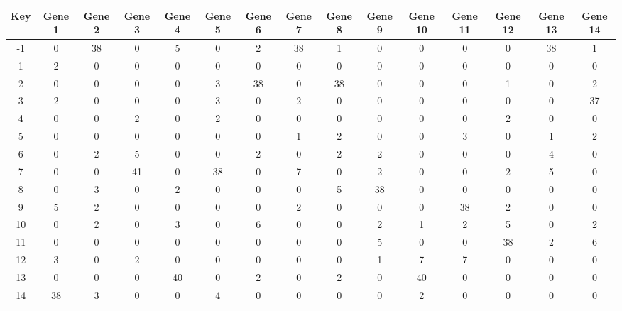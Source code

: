 \begin{tabular}{|c|c|c|c|c|c|c|c|c|c|c|c|c|c|c|}
\hline
Key & Gene 1 & Gene 2 & Gene 3 & Gene 4 & Gene 5 & Gene 6 & Gene 7 & Gene 8 & Gene 9 & Gene 10 & Gene 11 & Gene 12 & Gene 13 & Gene 14 \\
\hline
-1 & 0 & 38 & 0 & 5 & 0 & 2 & 38 & 1 & 0 & 0 & 0 & 0 & 38 & 1 \\
1 & 2 & 0 & 0 & 0 & 0 & 0 & 0 & 0 & 0 & 0 & 0 & 0 & 0 & 0 \\
2 & 0 & 0 & 0 & 0 & 3 & 38 & 0 & 38 & 0 & 0 & 0 & 1 & 0 & 2 \\
3 & 2 & 0 & 0 & 0 & 3 & 0 & 2 & 0 & 0 & 0 & 0 & 0 & 0 & 37 \\
4 & 0 & 0 & 2 & 0 & 2 & 0 & 0 & 0 & 0 & 0 & 0 & 2 & 0 & 0 \\
5 & 0 & 0 & 0 & 0 & 0 & 0 & 1 & 2 & 0 & 0 & 3 & 0 & 1 & 2 \\
6 & 0 & 2 & 5 & 0 & 0 & 2 & 0 & 2 & 2 & 0 & 0 & 0 & 4 & 0 \\
7 & 0 & 0 & 41 & 0 & 38 & 0 & 7 & 0 & 2 & 0 & 0 & 2 & 5 & 0 \\
8 & 0 & 3 & 0 & 2 & 0 & 0 & 0 & 5 & 38 & 0 & 0 & 0 & 0 & 0 \\
9 & 5 & 2 & 0 & 0 & 0 & 0 & 2 & 0 & 0 & 0 & 38 & 2 & 0 & 0 \\
10 & 0 & 2 & 0 & 3 & 0 & 6 & 0 & 0 & 2 & 1 & 2 & 5 & 0 & 2 \\
11 & 0 & 0 & 0 & 0 & 0 & 0 & 0 & 0 & 5 & 0 & 0 & 38 & 2 & 6 \\
12 & 3 & 0 & 2 & 0 & 0 & 0 & 0 & 0 & 1 & 7 & 7 & 0 & 0 & 0 \\
13 & 0 & 0 & 0 & 40 & 0 & 2 & 0 & 2 & 0 & 40 & 0 & 0 & 0 & 0 \\
14 & 38 & 3 & 0 & 0 & 4 & 0 & 0 & 0 & 0 & 2 & 0 & 0 & 0 & 0 \\
\hline
\end{tabular}
